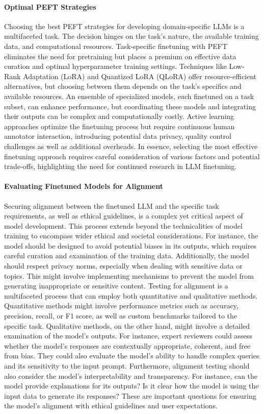 \documentclass{article}
\begin{document}
\paragraph{Optimal PEFT Strategies}

Choosing the best PEFT strategies for developing domain-specific LLMs is a multifaceted task. The decision hinges on the task's nature, the available training data, and computational resources. Task-specific finetuning with PEFT eliminates the need for pretraining but places a premium on effective data curation and optimal hyperparameter training settings. Techniques like Low-Rank Adaptation (LoRA) and Quantized LoRA (QLoRA) offer resource-efficient alternatives, but choosing between them depends on the task's specifics and available resources. An ensemble of specialized models, each finetuned on a task subset, can enhance performance, but coordinating these models and integrating their outputs can be complex and computationally costly. Active learning approaches optimize the finetuning process but require continuous human annotator interaction, introducing potential data privacy, quality control challenges as well as additional overheads. In essence, selecting the most effective finetuning approach requires careful consideration of various factors and potential trade-offs, highlighting the need for continued research in LLM finetuning.

\paragraph{Evaluating Finetuned Models for Alignment}

Securing alignment between the finetuned LLM and the specific task requirements, as well as ethical guidelines, is a complex yet critical aspect of model development. This process extends beyond the technicalities of model training to encompass wider ethical and societal considerations. For instance, the model should be designed to avoid potential biases in its outputs, which requires careful curation and examination of the training data. Additionally, the model should respect privacy norms, especially when dealing with sensitive data or topics. This might involve implementing mechanisms to prevent the model from generating inappropriate or sensitive content. Testing for alignment is a multifaceted process that can employ both quantitative and qualitative methods. Quantitative methods might involve performance metrics such as accuracy, precision, recall, or F1 score, as well as custom benchmarks tailored to the specific task. Qualitative methods, on the other hand, might involve a detailed examination of the model's outputs. For instance, expert reviewers could assess whether the model's responses are contextually appropriate, coherent, and free from bias. They could also evaluate the model's ability to handle complex queries and its sensitivity to the input prompt. Furthermore, alignment testing should also consider the model's interpretability and transparency. For instance, can the model provide explanations for its outputs? Is it clear how the model is using the input data to generate its responses? These are important questions for ensuring the model's alignment with ethical guidelines and user expectations.
\end{document}
